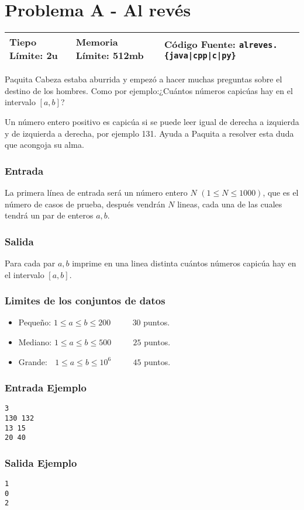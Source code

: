 \chapter*{Problema A - Al revés}

\begin{center}
  \begin{tabular}{ | l | l | l | }
    \hline
    Tiepo Límite: 2u & Memoria Límite: 512mb & Código Fuente: \texttt{alreves.\{java|cpp|c|py\}} \\
    \hline
  \end{tabular}
\end{center}

Paquita Cabeza estaba aburrida y empezó a hacer muchas preguntas sobre el destino de los hombres. Como por ejemplo:¿Cuántos números capicúas hay en el intervalo $[a,b]$?

Un número entero positivo es capicúa si se puede leer igual de derecha a izquierda  y de izquierda a derecha, por ejemplo 131. Ayuda a Paquita a resolver esta duda que acongoja su alma.

\subsection*{Entrada}

La primera línea de entrada será un número entero $N$ $(1 \leq  N\leq 1000)$, que es el número de casos de prueba, después vendrán $N$ lineas, cada una de las cuales tendrá un par de enteros $a, b$.

\subsection*{Salida}
Para cada par $a, b$ imprime en una linea distinta cuántos números capicúa hay en el intervalo $[a,b]$.


\subsection*{Limites de los conjuntos de datos}
\begin{itemize}
    \item Pequeño: $ 1\leq a \leq b \leq 200 $ $\quad \quad$ $30$ puntos.
    \item Mediano: $ 1\leq a \leq b \leq 500 $ $\quad \quad$ $25$ puntos.
    \item Grande: $\,\;\, 1\leq a \leq b \leq 10^6 $ $\quad \quad$ $45$ puntos.
\end{itemize}

\begin{multicols}{2}
\subsection*{Entrada Ejemplo}

\begin{Verbatim}
3
130 132
13 15
20 40
\end{Verbatim}
\subsection*{Salida Ejemplo}
\begin{Verbatim}
1
0
2
\end{Verbatim}
\end{multicols}



